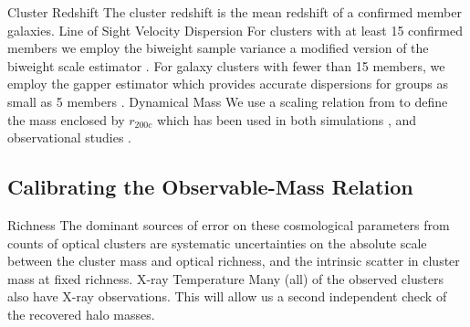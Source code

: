 \documentclass[12pt]{article}
\begin{document}
\begin{outline}[enumerate]
\begin{table}
\begin{tabular}{ccccccc}
		 		\hline
			\end{tabular}
			\label{tbl:cluster members}
		\end{table}
	\1 Cluster Redshift
		\2 The cluster redshift is the mean redshift of a confirmed member galaxies.
	\1 Line of Sight Velocity Dispersion
		\2 For clusters with at least 15 confirmed members we employ the biweight sample variance \citep{Ruel2014} a modified version of the biweight scale estimator \citep{Beers1990}.
		\2 For galaxy clusters with fewer than 15 members, we employ the gapper estimator \citep{Beers1990} which provides accurate dispersions for groups as small as 5 members \citep{Hou2009}.
	\1 Dynamical Mass
		\2 We use a scaling relation from \cite{Evrard2008,Saro2013, Munari2013} to define the mass enclosed by $r_{200c}$ which has been used in both simulations , and observational studies .
\end{outline}
\subsection{Calibrating the Observable-Mass Relation}
\begin{outline}[enumerate]
	\1 Richness
		\2 The dominant sources of error on these cosmological parameters from counts of optical clusters are systematic uncertainties on the absolute scale between the cluster mass and optical richness, and the intrinsic scatter in cluster mass at fixed richness.
	\1 X-ray Temperature
		\2 Many (all) of the observed clusters also have X-ray observations. This will allow us a second independent check of the recovered halo masses.
\end{outline}
\end{document}
